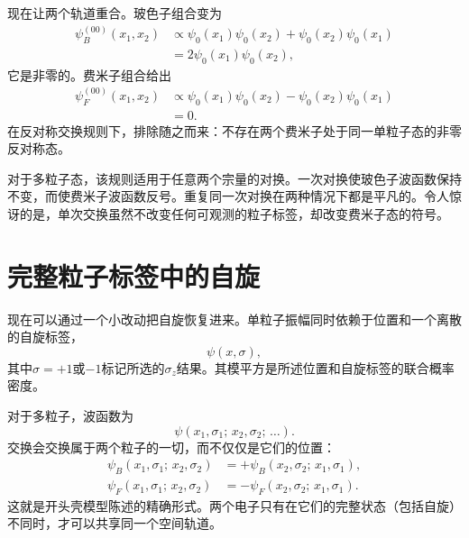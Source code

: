 现在让两个轨道重合。玻色子组合变为
\begin{align}
\psi_B^{(00)}(x_1,x_2)
&\propto
\psi_0(x_1)\psi_0(x_2)
+
\psi_0(x_2)\psi_0(x_1)\\
&=
2\psi_0(x_1)\psi_0(x_2),
\end{align}
它是非零的。费米子组合给出
\begin{align}
\psi_F^{(00)}(x_1,x_2)
&\propto
\psi_0(x_1)\psi_0(x_2)
-
\psi_0(x_2)\psi_0(x_1)\\
&=0.
\end{align}
在反对称交换规则下，排除随之而来：不存在两个费米子处于同一单粒子态的非零反对称态。

对于多粒子态，该规则适用于任意两个宗量的对换。一次对换使玻色子波函数保持不变，而使费米子波函数反号。重复同一次对换在两种情况下都是平凡的。令人惊讶的是，单次交换虽然不改变任何可观测的粒子标签，却改变费米子态的符号。

\section{完整粒子标签中的自旋}

现在可以通过一个小改动把自旋恢复进来。单粒子振幅同时依赖于位置和一个离散的自旋标签，
\begin{equation}
\psi(x,\sigma),
\end{equation}
其中\(\sigma=+1\)或\(-1\)标记所选的\(\sigma_z\)结果。其模平方是所述位置和自旋标签的联合概率密度。

对于多粒子，波函数为
\begin{equation}
\psi(x_1,\sigma_1;\,x_2,\sigma_2;\,\ldots).
\end{equation}
交换会交换属于两个粒子的一切，而不仅仅是它们的位置：
\begin{align}
\psi_B(x_1,\sigma_1;\,x_2,\sigma_2)
&=
+\psi_B(x_2,\sigma_2;\,x_1,\sigma_1),\\
\psi_F(x_1,\sigma_1;\,x_2,\sigma_2)
&=
-\psi_F(x_2,\sigma_2;\,x_1,\sigma_1).
\end{align}
这就是开头壳模型陈述的精确形式。两个电子只有在它们的完整状态（包括自旋）不同时，才可以共享同一个空间轨道。

\begin{classroomqa}
\end{classroomqa}

\begin{classroomqa}
\end{classroomqa}


